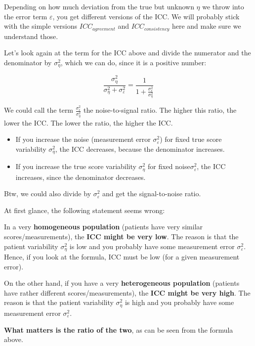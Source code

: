 \documentclass[
]{book}
\providecommand{\tightlist}{%
  \setlength{\itemsep}{0pt}\setlength{\parskip}{0pt}}
\begin{document}
Depending on how much deviation from the true but unknown \(\eta\) we throw into the error term \(\varepsilon\),
you get different versions of the ICC. We will probably stick with the simple versions \(ICC_{agreement}\)
and \(ICC_{consistency}\) here and make sure we understand those.

Let's look again at the term for the ICC above and divide the numerator and the denominator by
\(\sigma_{\eta}^2\), which we can do, since it is a positive number:

\[ \frac{\sigma_{\eta}^2}{\sigma_{\eta}^2 + \sigma_{\varepsilon}^2} = 
\frac{1}{1 + \frac{\sigma_{\varepsilon}^2}{\sigma_{\eta}^2}}\]

We could call the term \(\frac{\sigma_{\varepsilon}^2}{\sigma_{\eta}^2}\) the noise-to-signal ratio.
The higher this ratio, the lower the ICC. The lower the ratio, the higher the ICC.

\begin{itemize}
\tightlist
\item
  If you increase the noise (measurement error \(\sigma_{\varepsilon}^2\)) for fixed
  true score variability \(\sigma_{\eta}^2\), the ICC decreases, because the denominator
  increases.
\item
  If you increase the true score variability \(\sigma_{\eta}^2\) for fixed noise\(\sigma_{\varepsilon}^2\),
  the ICC increases, since the denominator decreases.
\end{itemize}

Btw, we could also divide by \(\sigma_{\varepsilon}^2\) and get the signal-to-noise ratio.

At first glance, the following statement seems wrong:

In a very \textbf{homogeneous population} (patients have very similar scores/measurements),
the \textbf{ICC might be very low}. The reason is that the patient variability \(\sigma_{\eta}^2\) is low
and you probably have some measurement error \(\sigma_{\varepsilon}^2\).
Hence, if you look at the formula, ICC must be low (for a given measurement error).

On the other hand, if you have a very \textbf{heterogeneous population} (patients have rather different
scores/measurements), the \textbf{ICC might be very high}.
The reason is that the patient variability \(\sigma_{\eta}^2\) is high and you probably
have some measurement error \(\sigma_{\varepsilon}^2\).

\textbf{What matters is the ratio of the two}, as can be seen from the formula above.
\end{document}
